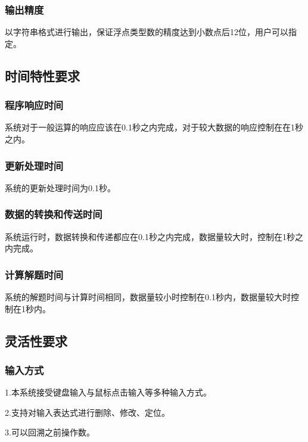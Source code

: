 \subsubsection{输出精度}

以字符串格式进行输出，保证浮点类型数的精度达到小数点后12位，用户可以指定。

\subsection{时间特性要求}

\subsubsection{程序响应时间}

系统对于一般运算的响应应该在0.1秒之内完成，对于较大数据的响应控制在在1秒之内。

\subsubsection{更新处理时间}

系统的更新处理时间为0.1秒。

\subsubsection{数据的转换和传送时间}

系统运行时，数据转换和传递都应在0.1秒之内完成，数据量较大时，控制在1秒之内完成。

\subsubsection{计算解题时间}

系统的解题时间与计算时间相同，数据量较小时控制在0.1秒内，数据量较大时控制在1秒内。

\subsection{灵活性要求}

\subsubsection{输入方式}

1.本系统接受键盘输入与鼠标点击输入等多种输入方式。

2.支持对输入表达式进行删除、修改、定位。

3.可以回溯之前操作数。

